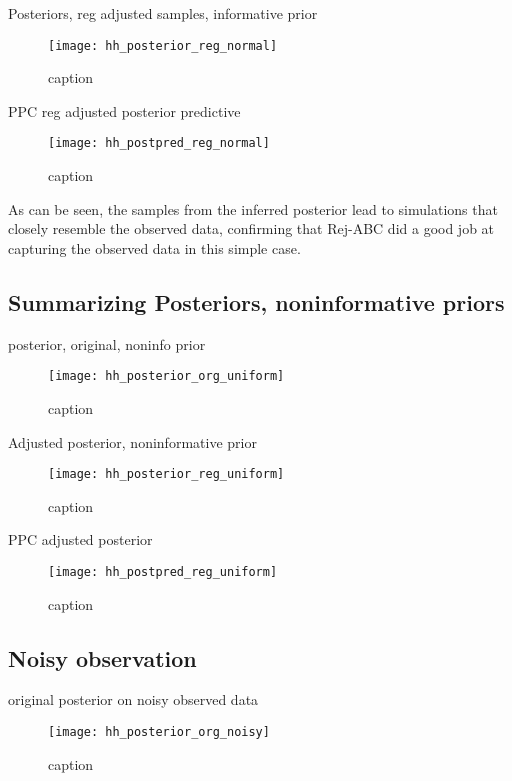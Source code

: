 Posteriors, reg adjusted samples, informative prior

\begin{figure}[H]
    \centering
    \texttt{[image: hh\_posterior\_reg\_normal]}
    \caption{caption}
    \label{fig:fig1}
\end{figure}

PPC reg adjusted posterior predictive 

\begin{figure}[H]
    \centering
    \texttt{[image: hh\_postpred\_reg\_normal]}
    \caption{caption}
    \label{fig:fig1}
\end{figure}


As can be seen, the samples from the inferred posterior lead to simulations that closely resemble the observed data, confirming that Rej-ABC did a good job at capturing the observed data in this simple case.

\subsection{Summarizing Posteriors, noninformative priors}

posterior, original, noninfo prior

\begin{figure}[H]
    \centering
    \texttt{[image: hh\_posterior\_org\_uniform]}
    \caption{caption}
    \label{fig:fig1}
\end{figure}

Adjusted posterior, noninformative prior

\begin{figure}[H]
    \centering
    \texttt{[image: hh\_posterior\_reg\_uniform]}
    \caption{caption}
    \label{fig:fig1}
\end{figure} 

PPC adjusted posterior 

\begin{figure}[H]
    \centering
    \texttt{[image: hh\_postpred\_reg\_uniform]}
    \caption{caption}
    \label{fig:fig1}
\end{figure}

\subsection{Noisy observation} 

original posterior on noisy observed data

\begin{figure}[H]
    \centering
    \texttt{[image: hh\_posterior\_org\_noisy]}
    \caption{caption}
    \label{fig:fig1}
\end{figure} 

